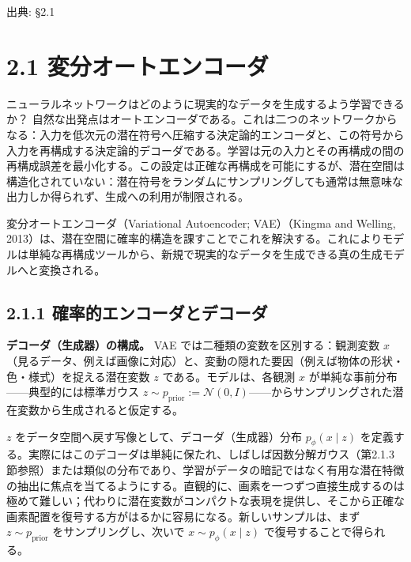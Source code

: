 

{\color{gray}\footnotesize 出典: §2.1\par}
\vspace{0.2em}

\section*{2.1 変分オートエンコーダ}


ニューラルネットワークはどのように現実的なデータを生成するよう学習できるか？ 自然な出発点はオートエンコーダである。これは二つのネットワークからなる：入力を低次元の潜在符号へ圧縮する決定論的エンコーダと、この符号から入力を再構成する決定論的デコーダである。学習は元の入力とその再構成の間の再構成誤差を最小化する。この設定は正確な再構成を可能にするが、潜在空間は構造化されていない：潜在符号をランダムにサンプリングしても通常は無意味な出力しか得られず、生成への利用が制限される。

変分オートエンコーダ（Variational Autoencoder; VAE）（Kingma and Welling, 2013）は、潜在空間に確率的構造を課すことでこれを解決する。これによりモデルは単純な再構成ツールから、新規で現実的なデータを生成できる真の生成モデルへと変換される。

\subsection*{2.1.1 確率的エンコーダとデコーダ}




\textbf{デコーダ（生成器）の構成。} VAE では二種類の変数を区別する：観測変数 $x$（見るデータ、例えば画像に対応）と、変動の隠れた要因（例えば物体の形状・色・様式）を捉える潜在変数 $z$ である。モデルは、各観測 $x$ が単純な事前分布——典型的には標準ガウス $z \sim p_{\mathrm{prior}} := \mathcal{N}(0,I)$——からサンプリングされた潜在変数から生成されると仮定する。

$z$ をデータ空間へ戻す写像として、デコーダ（生成器）分布 $p_\phi(x\mid z)$ を定義する。実際にはこのデコーダは単純に保たれ、しばしば因数分解ガウス（第2.1.3節参照）または類似の分布であり、学習がデータの暗記ではなく有用な潜在特徴の抽出に焦点を当てるようにする。直観的に、画素を一つずつ直接生成するのは極めて難しい；代わりに潜在変数がコンパクトな表現を提供し、そこから正確な画素配置を復号する方がはるかに容易になる。新しいサンプルは、まず $z \sim p_{\mathrm{prior}}$ をサンプリングし、次いで $x \sim p_\phi(x\mid z)$ で復号することで得られる。

